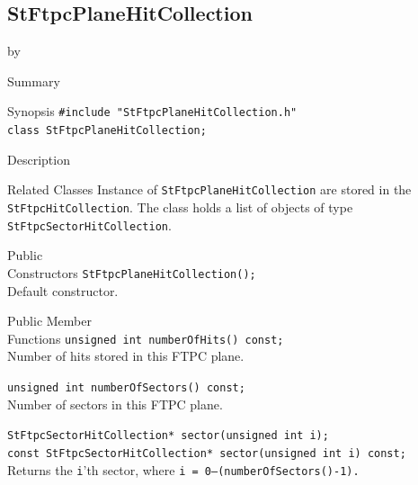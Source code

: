 \documentclass[twoside]{article}
\newcommand{\entrylabel}[1]{\mbox{\textbf{{#1}}}\hfil}%
\newenvironment{entry}
{\begin{list}{}%
    {\renewcommand{\makelabel}{\entrylabel}%
     \setlength{\labelwidth}{90pt}%
     \setlength{\leftmargin}{\labelwidth}
     \advance\leftmargin by \labelsep%
      }%
    }%
  {\end{list}}
\newcommand{\Entrylabel}[1]%
{\raisebox{0pt}[1ex][0pt]{\makebox[\labelwidth][l]%
    {\parbox[t]{\labelwidth}{\hspace{0pt}\textbf{{#1}}}}}}
\newenvironment{Entry}%
{\renewcommand{\entrylabel}{\Entrylabel}\begin{entry}}%
  {\end{entry}}
\begin{document}
\subsection{StFtpcPlaneHitCollection}
\label{sec:StFtpcPlaneHitCollection}
\begin{Entry}
\item[Summary]
    
\item[Synopsis]
    \verb+#include "StFtpcPlaneHitCollection.h"+\\
    \verb+class StFtpcPlaneHitCollection;+\\
\item[Description]
    
\item[Related Classes] Instance of \texttt{StFtpcPlaneHitCollection}
    are stored in the \texttt{StFtpcHitCollection}.  The class holds a
    list of objects of type \texttt{StFtpcSectorHitCollection}.
   
\item[Public\\ Constructors]
    \verb+StFtpcPlaneHitCollection();+\\
    Default constructor.
    
\item[Public Member\\ Functions]
    \verb+unsigned int numberOfHits() const;+\\
    Number of hits stored in this FTPC plane.
    
    \verb+unsigned int numberOfSectors() const;+\\
    Number of sectors in this FTPC plane.
    
    \verb+StFtpcSectorHitCollection* sector(unsigned int i);+\\
    \verb+const StFtpcSectorHitCollection* sector(unsigned int i) const;+\\
    Returns the \texttt{i}'th sector, where \texttt{i =
        0--(numberOfSectors()-1).}
\end{Entry}
\clearpage
\end{document}
